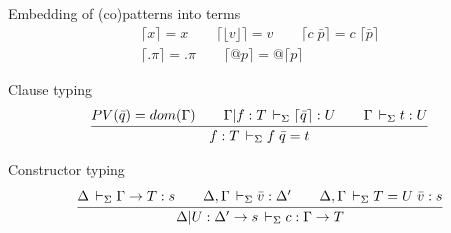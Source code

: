 \documentclass[acmlarge,fleqn]{acmart}\settopmatter{}
\renewcommand{\|}{\mid}
\begin{document}
Embedding of (co)patterns into terms 
\begin{gather*}
\lceil x \rceil = x \qquad
\lceil \lfloor v \rfloor \rceil = v \qquad
\lceil c\; \bar{p} \rceil = c\; \lceil \bar{p} \rceil \\
\lceil .\pi \rceil = .\pi \qquad
\lceil @p \rceil = @ \lceil p \rceil
\end{gather*}


%
%

Clause typing 
\begin{gather*}
\ru{PV(\bar{q}) = dom(\Gamma) \qquad
    \Gamma | f : T \ders \lceil \bar{q} \rceil : U \qquad
    \Gamma \ders t : U}
   {f : T \ders f\; \bar{q} = t}
\end{gather*}

Constructor typing 
\begin{gather*}
\ru{\Delta \ders \Gamma \to T : s \qquad
    \Delta,\Gamma \ders \bar{v} : \Delta' \qquad
    \Delta,\Gamma \ders T = U\; \bar{v} : s}
   {\Delta | U : \Delta' \to s \ders c : \Gamma \to T}
\end{gather*}
\end{document}
